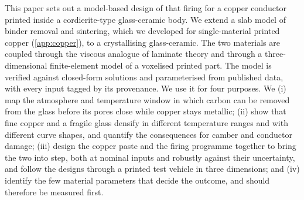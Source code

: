 This paper sets out a model-based design of that firing for a copper conductor printed inside a cordierite-type glass-ceramic body. We extend a slab model of binder removal and sintering, which we developed for single-material printed copper (\ref{app:copper}), to a crystallising glass-ceramic. The two materials are coupled through the viscous analogue of laminate theory and through a three-dimensional finite-element model of a voxelised printed part. The model is verified against closed-form solutions and parameterised from published data, with every input tagged by its provenance. We use it for four purposes. We (i) map the atmosphere and temperature window in which carbon can be removed from the glass before its pores close while copper stays metallic; (ii) show that fine copper and a fragile glass densify in different temperature ranges and with different curve shapes, and quantify the consequences for camber and conductor damage; (iii) design the copper paste and the firing programme together to bring the two into step, both at nominal inputs and robustly against their uncertainty, and follow the designs through a printed test vehicle in three dimensions; and (iv) identify the few material parameters that decide the outcome, and should therefore be measured first.
